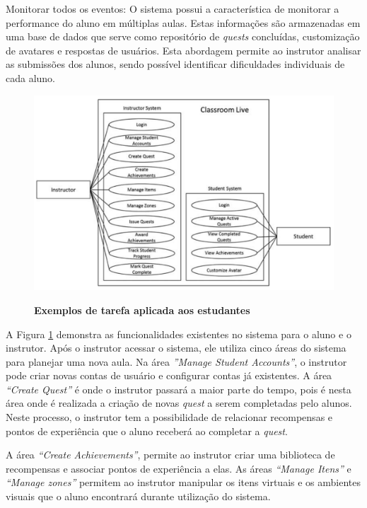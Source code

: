 \documentclass[
	12pt,				%
	oneside,			%
	a4paper,			%
	english,			%
	french,				%
	spanish,			%
	brazil,				%
	]{abntex2}
\begin{document}
Monitorar todos os eventos: O sistema possui a característica de monitorar a performance do aluno em múltiplas aulas. Estas informações são armazenadas em uma base de dados que serve como repositório de \textit{quests} concluídas, customização de avatares e respostas de usuários. Esta abordagem permite ao instrutor analisar as submissões dos alunos, sendo possível identificar dificuldades individuais de cada aluno. 

\begin{figure}[ht]
\centering
\caption{\textbf{Exemplos de tarefa aplicada aos estudantes}}
\includegraphics[width=1\textwidth]{imagens/classroom_diagrama.png}
\label{fig:classroom_diagrama}
\end{figure}

A Figura \ref{fig:classroom_diagrama} demonstra as funcionalidades existentes no sistema para o aluno e o instrutor. Após o instrutor acessar o sistema, ele utiliza cinco áreas do sistema para planejar uma nova aula. Na área \textit{”Manage Student Accounts”}, o instrutor pode criar novas contas de usuário e configurar contas já existentes. A área \textit{“Create Quest”} é onde o instrutor passará a maior parte do tempo, pois é nesta área onde é realizada a criação de novas \textit{quest} a serem completadas pelo alunos. Neste processo, o instrutor tem a possibilidade de relacionar recompensas e pontos de experiência que o aluno receberá ao completar a \textit{quest}. 

A área \textit{“Create Achievements”}, permite ao instrutor criar uma biblioteca de recompensas e associar pontos de experiência a elas. As áreas \textit{“Manage Itens”} e \textit{“Manage zones”} permitem ao instrutor manipular os itens virtuais e os ambientes visuais que o aluno encontrará durante utilização do sistema.
\end{document}
